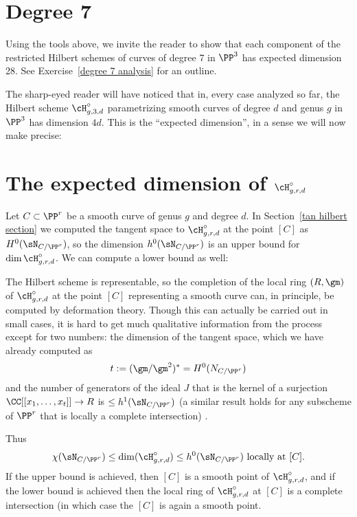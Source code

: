 \section{Degree 7}

Using the tools above, we invite the reader to show that each component of the restricted Hilbert schemes of curves of degree 7
in $\PP^3$ has expected dimension 28. See Exercise~\ref{degree 7 analysis} for an outline.


The sharp-eyed reader will have noticed that in, every case analyzed so far,  the Hilbert scheme
$\cH^\circ_{g,3,d}$ parametrizing smooth curves of degree $d$ and genus $g$ in $\PP^3$ has dimension $4d$. 
 This is the ``expected dimension'',  in a sense we will now make precise:
 
\section{The expected dimension of $\cH^\circ_{g,r,d}$}\label{chi N}

Let $C\subset \PP^r$ be a smooth curve of genus $g$ and degree $d$. In Section~\ref{tan hilbert section}
we computed the tangent space to $\cH^\circ_{g,r,d}$ at the point $[C]$ as $H^0(\sN_{C/\PP^r})$, so 
the dimension $h^0( \sN_{C/\PP^r})$ is an upper bound for $\dim \cH^\circ_{g,r,d}$. We can compute a lower bound as well:


\begin{fact}\label{deformation bound}
 The Hilbert scheme is representable, so
the completion of the local ring $(R,\gm)$ of $\cH^\circ_{g,r,d}$ at the point $[C]$ representing a smooth curve can, in principle, be computed by deformation theory.
Though this can actually be carried out in small cases, it is hard to get much qualitative information from the process
except for two numbers: the dimension of the tangent space, which we have already computed as 
$$
t:= (\gm/\gm^2)^*  = H^0(N_{C/\PP^r})
$$
and the number of generators of the ideal $J$ that is the kernel of a surjection  $\CC[[ x_1,\dots, x_t]] \to R$
is $\leq h^1( \sN_{C/\PP^r}) $ (a similar result holds for any subscheme of $\PP^r$ that is locally a complete intersection)
\cite[Corollaries 6.2.5, 6.4.11 and Proposition 6.5.2]{MR2223408}. 

Thus 
$$
\chi(\sN_{C/\PP^r}) \leq \dim (\cH^\circ_{g,r,d})\leq h^0(\sN_{C/\PP^r}) \hbox{ locally at } [C].
$$
If the upper bound is achieved, then $[C]$ is a smooth point of $\cH^\circ_{g,r,d}$, and if the lower bound is achieved
then the local ring of $\cH^\circ_{g,r,d}$ at $[C]$ is a complete intersection (in which case the
$[C]$ is again a smooth point.
\end{fact}

